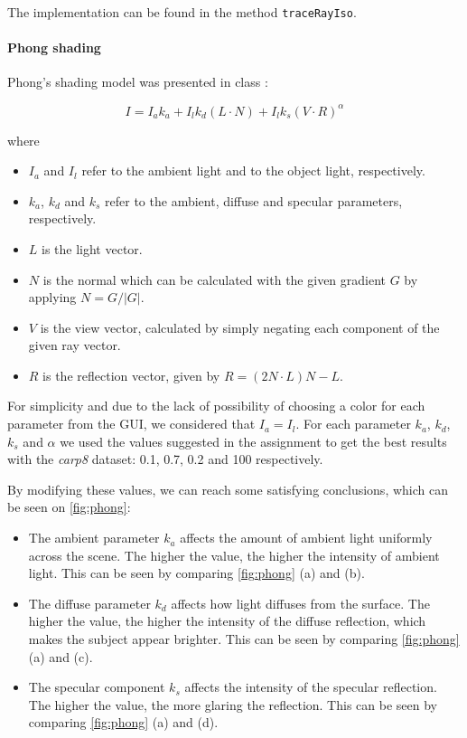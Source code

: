 \documentclass[a4paper]{article}
\begin{document}
The implementation can be found in the method {\tt traceRayIso}.

\paragraph{Phong shading}

Phong's shading model was presented in class \citep{2imv20_2}:

$$ I = I_a k_a + I_lk_d(L \cdot N)+I_l k_s (V \cdot R)^\alpha$$

\noindent where
\begin{itemize}[noitemsep]
  \item $I_a$ and $I_l$ refer to the ambient light and to the object light, respectively.
  \item $k_a$, $k_d$ and $k_s$ refer to the ambient, diffuse and specular parameters, respectively.
  \item $L$ is the light vector.
  \item $N$ is the normal which can be calculated with the given gradient $G$ by applying $N= {G}/{|G|}$.
  \item $V$ is the view vector, calculated by simply negating each component of the given ray vector.
  \item $R$ is the reflection vector, given by $R = (2N \cdot L)N-L$.
\end{itemize}

For simplicity and due to the lack of possibility of choosing a color for each parameter from the GUI, we considered that $I_a=I_l$. For each parameter $k_a$, $k_d$, $k_s$ and $\alpha$ we used the values suggested in the assignment to get the best results with the \textit{carp8} dataset: 0.1, 0.7, 0.2 and 100 respectively.

By modifying these values, we can reach some satisfying conclusions, which can be seen on \autoref{fig:phong}:
\begin{itemize}[noitemsep]
  \item The ambient parameter $k_a$ affects the amount of ambient light uniformly across the scene. The higher the value, the higher the intensity of ambient light. This can be seen by comparing \autoref{fig:phong} (a) and (b).
  \item The diffuse parameter $k_d$ affects how light diffuses from the surface. The higher the value, the higher the intensity of the diffuse reflection, which makes the subject appear brighter. This can be seen by comparing \autoref{fig:phong} (a) and (c).
  \item The specular component $k_s$ affects the intensity of the specular reflection. The higher the value, the more glaring the reflection. This can be seen by comparing \autoref{fig:phong} (a) and (d).
\end{itemize}
\end{document}
